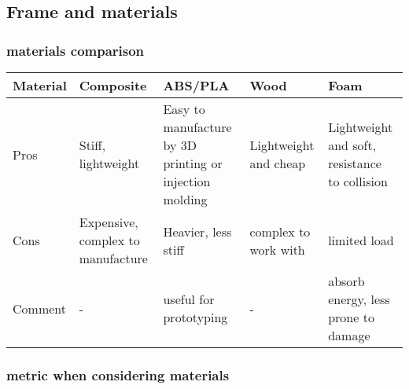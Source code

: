 \documentclass[]{article}
\begin{document}
\subsection{Frame and materials}\label{header-n1863}

\subsubsection{materials comparison}\label{header-n1864}

\begin{longtable}[]{@{}lllll@{}}
\toprule
Material & Composite & ABS/PLA & Wood & Foam\tabularnewline
\midrule
\endhead
Pros & Stiff, lightweight & Easy to manufacture by 3D printing or
injection molding & Lightweight and cheap & Lightweight and soft,
resistance to collision\tabularnewline
Cons & Expensive, complex to manufacture & Heavier, less stiff & complex
to work with & limited load\tabularnewline
Comment & - & useful for prototyping & - & absorb energy, less prone to
damage\tabularnewline
\bottomrule
\end{longtable}

\subsubsection{metric when considering materials}\label{header-n1890}
\end{document}
